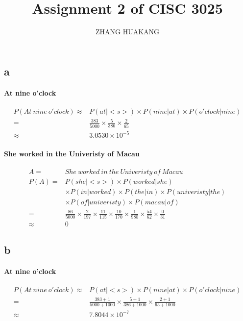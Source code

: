 \documentclass{article}
\title{Assignment 2 of CISC 3025}
\author{ZHANG HUAKANG}
\begin{document}
    \maketitle
    \section{}
    \subsection*{a}
    \paragraph{At nine o'clock}
    \begin{equation}
        \begin{split}
            P(At\  nine\  o'clock)\approx &P(at|<s>)\times P(nine|at)\times P(o'clock|nine)\\
                                    =&\frac{383}{5000}\times\frac{5}{386}\times\frac{2}{65}\\
                                    \approx&3.0530\times 10^{-5}
        \end{split}
    \end{equation}
    \paragraph{She worked in the Univeristy of Macau}
    \begin{equation}
        \begin{split}
            A=&She\ worked\  in\  the\  Univeristy\  of\  Macau\\
            P(A)=&P(she|<s>)\times P(worked|she)\\
                &\times P(in|worked)\times P(the|in)\times P(univeristy|the)\\
                &\times P(of|univeristy)\times P(macau|of)\\
                =&\frac{86}{5000}\times\frac{2}{197}\times\frac{11}{115}\times\frac{10}{170}\times\frac{1}{980}\times\frac{54}{62}\times\frac{0}{31}\\
                \approx&0
        \end{split}
    \end{equation}
    \subsection*{b}
    \paragraph{At nine o'clock}
    \begin{equation}
        \begin{split}
            P(At\  nine\  o'clock)\approx &P(at|<s>)\times P(nine|at)\times P(o'clock|nine)\\
                                    =&\frac{383+1}{5000+1000}\times\frac{5+1}{386+1000}\times\frac{2+1}{65+1000}\\
                                    \approx&7.8044\times 10^{-7}
        \end{split}
    \end{equation}
\end{document}
